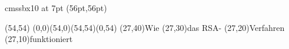 

\font\myfont cmssbx10 at 7pt
\PapierGroesse(56pt,56pt)




\begin{psfigur}(54,54)
\psPolygon[fuellfarbe=0.753,eckradius=5,linienstil=](0,0)(54,0)(54,54)(0,54)
\psNeueSchicht
\rpin(27,40){\myfont Wie }
\rpin(27,30){\myfont das RSA-}
\rpin(27,20){\myfont Verfahren}
\rpin(27,10){\myfont funktioniert}
\end{psfigur}
 
